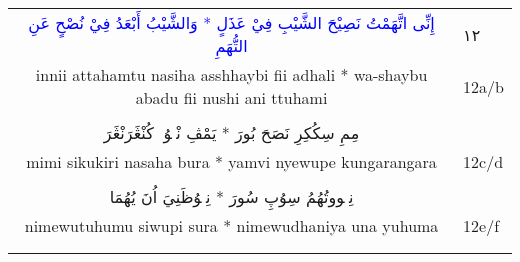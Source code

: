 \documentclass[a4paper, 10pt]{report}
\begin{document}
\begin{longtable}{cl}
\textcolor{blue}{\textarabic{إِنِّى اتَّهَمْتُ نَصِيْحَ الشَّيْبِ فِيْ عَذَلٍ * وَالشَّيْبُ أَبْعَدُ فِيْ نُصْحٍ عَنِ التُّهَمِ}} & \textarabic{١٢} \\* 
innii attahamtu nasiha asshhaybi fii adhali * wa-shaybu abadu fii nushi ani ttuhami & 12a/b \\* 
\E{ } & \\[2mm] 
\textcolor{mygreen}{\textarabic{مِمِ سِكُكِرِ نَصَحَ بُورَ * يَمْڤِ نْيٖوُپٖ كُنْڠَرَنْڠَرَ}} &  \\* 
mimi sikukiri nasaha bura * yamvi nyewupe kungarangara & 12c/d \\* 
\E{ } & \\[2mm] 
\textcolor{mygreen}{\textarabic{نِمٖووتُهُمُ سِوُپِ سُورَ * نِمٖوُظَنِيَ اُنَ يُهُمَا}} &  \\* 
nimewutuhumu siwupi sura * nimewudhaniya una yuhuma & 12e/f \\* 
\E{ } & \\[2mm] 
\\[6mm] 

\end{longtable} 

\renewcommand{\bibname}{References} 
\begingroup 
\printbibliography 
\endgroup 
\end{document}
